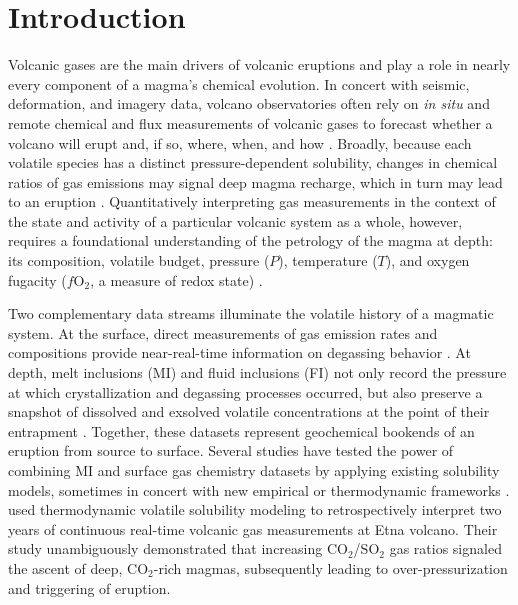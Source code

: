 \documentclass[draft, english]{volcanica-template}
\begin{document}
\hypertarget{introduction}{%
\section{Introduction}}
Volcanic gases are the main drivers of volcanic eruptions and play a role in nearly every component of a magma's chemical evolution. In concert with seismic, deformation, and imagery data, volcano observatories often rely on \textit{in situ} and remote chemical and flux measurements of volcanic gases to forecast whether a volcano will erupt and, if so, where, when, and how \parencite{Kern2022,Aiuppa2025a,Aiuppa2025b,acocella2024towards,poland2020partly,kilburn2022forecasting}. Broadly, because each volatile species has a distinct pressure-dependent solubility, changes in chemical ratios of gas emissions may signal deep magma recharge, which in turn may lead to an eruption \parencite{Aiuppa2007,Giggenbach1996,demoor2016turmoil}. Quantitatively interpreting gas measurements in the context of the state and activity of a particular volcanic system as a whole, however, requires a foundational understanding of the petrology of the magma at depth: its composition, volatile budget, pressure ($P$), temperature ($T$), and oxygen fugacity ($f$O$_2$, a measure of redox state) \parencite{Aiuppa2007,iacovino2015,Werner2020,hughes2024modeling,Ding2025,lerner2021petrologic,demoor2016turmoil}. 

Two complementary data streams illuminate the volatile history of a magmatic system. At the surface, direct measurements of gas emission rates and compositions provide near-real-time information on degassing behavior \parencite{aiuppa2010unusually,allard2016degassing,fischer1996relationship,werner2011gas,werner2013degassing}. At depth, melt inclusions (MI) and fluid inclusions (FI) not only record the pressure at which crystallization and degassing processes occurred, but also preserve a snapshot of dissolved and exsolved volatile concentrations at the point of their entrapment \parencite{roedder1979origin,lowenstern1995applications,metrich2008volatile,rose2021silicate,wieser2021reconstructing,wieser2025fluid}. Together, these datasets represent geochemical bookends of an eruption from source to surface. Several studies have tested the power of combining MI and surface gas chemistry datasets by applying existing solubility models, sometimes in concert with new empirical or thermodynamic frameworks \parencite{iacovino2015,Werner2020,shinohara2003variation,aiuppa2010model,burton2007role,oppenheimer2011mantle,wardell2001white}. \textcite{Aiuppa2007} used thermodynamic volatile solubility modeling \parencite{moretti2003model} to retrospectively interpret two years of continuous real-time volcanic gas measurements at Etna volcano. Their study unambiguously demonstrated that increasing CO$_2$/SO$_2$ gas ratios signaled the ascent of deep, CO$_2$-rich magmas, subsequently leading to over-pressurization and triggering of eruption. 
\end{document}
